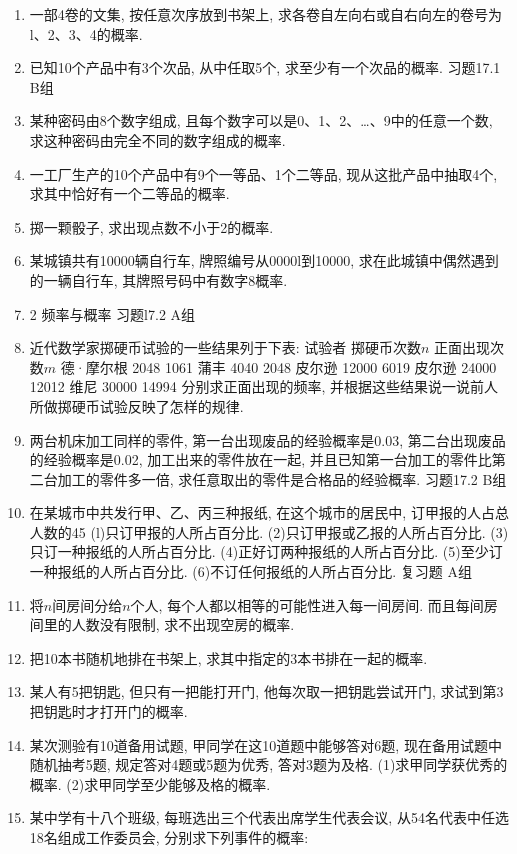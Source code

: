 \documentclass[10pt,a4paper]{article}
\begin{document}
\begin{enumerate}[1.]
\item 一部4卷的文集, 按任意次序放到书架上, 求各卷自左向右或自右向左的卷号为l、2、3、4的概率.
\item 已知10个产品中有3个次品, 从中任取5个, 求至少有一个次品的概率.
习题17.1   B组
\item 某种密码由8个数字组成, 且每个数字可以是0、1、2、…、9中的任意一个数, 求这种密码由完全不同的数字组成的概率.
\item 一工厂生产的10个产品中有9个一等品、1个二等品, 现从这批产品中抽取4个, 求其中恰好有一个二等品的概率.
\item 掷一颗骰子, 求出现点数不小于2的概率.
\item 某城镇共有10000辆自行车, 牌照编号从0000l到10000, 求在此城镇中偶然遇到的一辆自行车, 其牌照号码中有数字8概率.
\item 2  频率与概率
习题l7.2 A组
\item 近代数学家掷硬币试验的一些结果列于下表:
试验者	掷硬币次数$n$	正面出现次数$m$
德·摩尔根	2048	1061
蒲丰	4040	2048
皮尔逊	12000	6019
皮尔逊	24000	12012
维尼	30000	14994
分别求正面出现的频率, 并根据这些结果说一说前人所做掷硬币试验反映了怎样的规律.
\item 两台机床加工同样的零件, 第一台出现废品的经验概率是0.03, 第二台出现废品的经验概率是0.02, 加工出来的零件放在一起, 并且已知第一台加工的零件比第二台加工的零件多一倍, 求任意取出的零件是合格品的经验概率.
习题17.2 B组
\item 在某城市中共发行甲、乙、丙三种报纸, 在这个城市的居民中, 订甲报的人占总人数的45%
(l)只订甲报的人所占百分比.
(2)只订甲报或乙报的人所占百分比.
(3)只订一种报纸的人所占百分比.
(4)正好订两种报纸的人所占百分比.
(5)至少订一种报纸的人所占百分比.
(6)不订任何报纸的人所占百分比.
复习题
A组
\item 将$n$间房间分给$n$个人, 每个人都以相等的可能性进入每一间房间. 而且每间房间里的人数没有限制, 求不出现空房的概率.
\item 把10本书随机地排在书架上, 求其中指定的3本书排在一起的概率.
\item 某人有5把钥匙, 但只有一把能打开门, 他每次取一把钥匙尝试开门, 求试到第3把钥匙时才打开门的概率.
\item 某次测验有10道备用试题, 甲同学在这10道题中能够答对6题, 现在备用试题中随机抽考5题, 规定答对4题或5题为优秀, 答对3题为及格.
(1)求甲同学获优秀的概率.
(2)求甲同学至少能够及格的概率.
\item 某中学有十八个班级, 每班选出三个代表出席学生代表会议, 从54名代表中任选18名组成工作委员会, 分别求下列事件的概率:

\end{enumerate}
\end{document}
